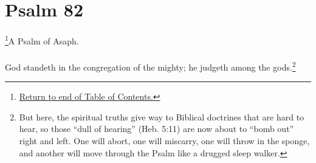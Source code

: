 \chapter{Psalm 82}
\footnote{\textcolor[rgb]{0.00,0.25,0.00}{\hyperlink{TOC}{Return to end of Table of Contents.}}}\textcolor[rgb]{0.00,0.00,1.00}{A Psalm of Asaph.}\\
\\
\textcolor[rgb]{0.00,0.00,1.00}{God standeth in the congregation of the mighty; he judgeth among the gods.}\footnote{But here, the spiritual truths give way to Biblical doctrines that are hard to hear, so those “dull of hearing” (Heb. 5:11) are now about to “bomb out” right and left. One will abort, one will miscarry, one will throw in the sponge, and another will move through the Psalm like a drugged sleep walker.\cite{Ruckman1992Psalms}}
